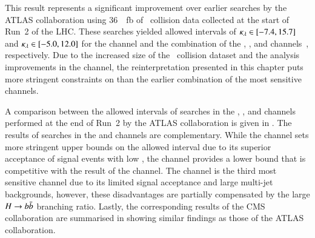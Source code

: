 This result represents a significant improvement over earlier searches by the
ATLAS collaboration using \SI{36}{\per\femto\barn} of \pp~collision data
collected at the start of Run~2 of the LHC. These searches yielded allowed
\klambda intervals of \mbox{$\kappa_{\lambda} \in [-7.4, 15.7]$} and
\mbox{$\kappa_{\lambda} \in [-5.0, 12.0]$} for the \bbtautau channel and the combination
of the \bbbb, \bbtautau, and \bbyy channels~\cite{HDBS-2018-58},
respectively. Due to the increased size of the \pp~collision dataset and the
analysis improvements in the \bbtautau channel, the reinterpretation presented
in this chapter puts more stringent constraints on \klambda than the earlier
combination of the most sensitive channels.

A comparison between the allowed \klambda intervals of searches in the \bbbb,
\bbtautau, and \bbyy channels performed at the end of Run~2 by the ATLAS
collaboration is given in . The results of searches in
the \bbtautau and \bbyy channels are complementary. While the \bbyy channel sets
more stringent upper bounds on the allowed \klambda interval due to its superior
acceptance of signal events with low \mHH, the \bbtautau channel provides a
lower bound that is competitive with the result of the \bbyy channel. The \bbbb
channel is the third most sensitive channel due to its limited signal acceptance
and large multi-jet backgrounds, however, these disadvantages are partially
compensated by the large $H \to b\bar{b}$ branching ratio. Lastly, the
corresponding results of the CMS collaboration are summarised in
 showing similar findings as those of the ATLAS
collaboration.

